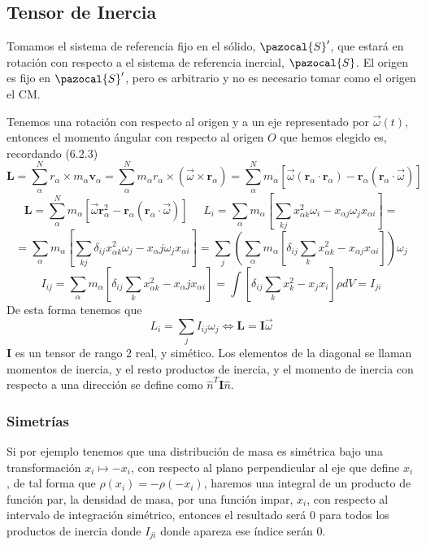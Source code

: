 \subsection{Tensor de Inercia}
Tomamos el sistema de referencia fijo en el sólido, $\pazocal{S}'$, que estará en rotación con respecto a el sistema de referencia inercial, $\pazocal{S}$. El origen es fijo en $\pazocal{S}'$, pero es arbitrario y no es necesario tomar como el origen el CM.

Tenemos una rotación con respecto al origen y a un eje representado por $\vec{\omega}(t)$, entonces el momento ángular con respecto al origen $O$ que hemos elegido es, recordando (6.2.3)
\[
    \mathbf{L} = \sum_\alpha^N r_\alpha \times m_\alpha \mathbf{v}_\alpha = \sum_\alpha^N m_\alpha r_\alpha \times (\vec{\omega} \times \mathbf{r}_\alpha) = \sum_\alpha^N m_\alpha \left[\vec{\omega} (\mathbf{r}_\alpha \cdot \mathbf{r}_\alpha) - \mathbf{r}_\alpha (\mathbf{r}_\alpha \cdot \vec{\omega})\right]
\]\vspace{-10pt}
\[
    \mathbf{L} = \sum_\alpha^N m_\alpha \left[\vec{\omega} \mathbf{r}_\alpha^2 - \mathbf{r}_\alpha (\mathbf{r}_\alpha \cdot \vec{\omega})\right] \ \ \ \ \ \ L_i = \sum_\alpha m_\alpha \left[ \sum_{kj} x^2_{\alpha k} \omega_i - x_{\alpha j} \omega_j x_{\alpha i}\right] = 
\]\vspace{-10pt}
\[
    = \sum_\alpha m_\alpha \left[ \sum_{kj} \delta_{ij}x^2_{\alpha k} \omega_j - x_\alpha j \omega_j x_{\alpha i}\right] = \sum_j \left(\sum_\alpha m_\alpha \left[\delta_{ij}\sum_k x^2_{\alpha k} - x_{\alpha j} x_{\alpha i}\right]\right) \omega_j
\]
\vspace{-10pt}
\begin{equation} \label{6.1.1}
    I_{ij} = \sum_\alpha m_\alpha \left[\delta_{ij} \sum_k x^2_{\alpha k} - x_\alpha j x_{\alpha i}\right] = \int \left[\delta_{ij}\sum_k x^2_{k} - x_{j} x_{i}\right] \rho dV = I_{ji}
\end{equation} 
De esta forma tenemos que
\begin{equation} \label{6.1.1}
    L_i = \sum_j I_{ij} \omega_j \iff \mathbf{L} = \mathbf{I} \vec{\omega}
\end{equation} 
$\mathbf{I}$ es un tensor de rango 2 real, y simético. Los elementos de la diagonal se llaman momentos de inercia, y el resto productos de inercia, y el momento de inercia con respecto a una dirección se define como $\hat{n}^T \mathbf{I} \hat{n}$.

\subsubsection{Simetrías}
Si por ejemplo tenemos que una distribución de masa es simétrica bajo una transformación $x_i \mapsto -x_i$, con respecto al plano perpendicular al eje que define $x_i$, de tal forma que $\rho(x_i) = -\rho(-x_i)$, haremos una integral de un producto de función par, la densidad de masa, por una función impar, $x_i$, con respecto al intervalo de integración simétrico, entonces el resultado será 0 para todos los productos de inercia donde $I_{ji}$ donde apareza ese índice serán 0.

